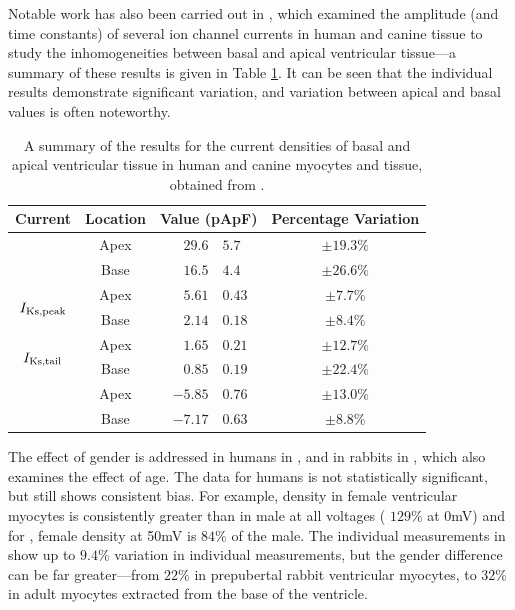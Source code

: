 \documentclass[../thesis-main.tex]{subfiles}
\begin{document}
 Notable work has also been carried out in \citet{Szentadrassy2005}, which examined the amplitude (and time constants) of several ion channel currents in human and canine tissue to study the inhomogeneities between basal and apical ventricular tissue---a summary of these results is given in Table \ref{table:szentadrassy-results}. It can be seen that the individual results demonstrate significant variation, and variation between apical and basal values is often noteworthy.
 \begin{table}
  \centering
  \begin{tabular}{ccr@{$\pm$}lc}
   Current					& Location	& \multicolumn{2}{c}{Value (pApF\super{-1})}	& Percentage Variation	\\
   \hline
   \hline
   \multirow{2}{*}{\ito{}}			& Apex		& $29.6$&$5.7$					& $\pm19.3\%$		\\
						& Base		& $16.5$&$4.4$					& $\pm26.6\%$		\\
   \hline
   \multirow{2}{*}{$I_\textnormal{Ks,peak}$}	& Apex		& $5.61$&$0.43$					& $\pm7.7\%$		\\
						& Base		& $2.14$&$0.18$					& $\pm8.4\%$		\\
   \multirow{2}{*}{$I_\textnormal{Ks,tail}$}	& Apex		& $1.65$&$0.21$					& $\pm12.7\%$		\\
						& Base		& $0.85$&$0.19$					& $\pm22.4\%$		\\
   \hline
   \multirow{2}{*}{\ica{}}			& Apex		& $-5.85$&$0.76$				& $\pm13.0\%$		\\
						& Base		& $-7.17$&$0.63$				& $\pm8.8\%$		\\
  \end{tabular}
  \caption[Summary of current density results from \citet{Szentadrassy2005}.]{A summary of the results for the current densities of basal and apical ventricular tissue in human and canine myocytes and tissue, obtained from \citet{Szentadrassy2005}.}
  \label{table:szentadrassy-results}
 \end{table}
 
 The effect of gender is addressed in humans in \citet{Verkerk2005}, and in rabbits in \citet{Sims2008}, which also examines the effect of age. The data for humans is not statistically significant, but still shows consistent bias. For example, \ica{} density in female ventricular myocytes is consistently greater than in male at all voltages (\eg{} $129\%$ at 0mV) and for \ito{}, female \ito{} density at 50mV is $84\%$ of the male. The individual measurements in \citet{Sims2008} show up to $9.4\%$ variation in individual measurements, but the gender difference can be far greater---from $22\%$ in prepubertal rabbit ventricular myocytes, to $32\%$ in adult myocytes extracted from the base of the ventricle.
 
\end{document}
